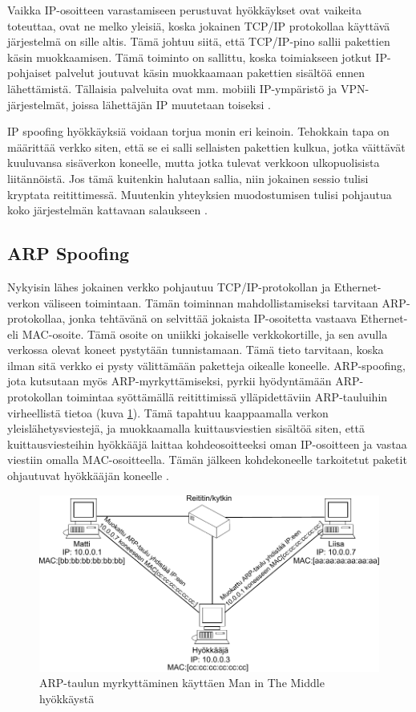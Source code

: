 Vaikka IP-osoitteen varastamiseen perustuvat hyökkäykset ovat vaikeita toteuttaa,
ovat ne melko yleisiä, koska jokainen TCP/IP protokollaa käyttävä järjestelmä on sille altis. Tämä
johtuu siitä, että TCP/IP-pino sallii pakettien käsin muokkaamisen. Tämä
toiminto on sallittu, koska toimiakseen jotkut IP-pohjaiset palvelut joutuvat
käsin muokkaamaan pakettien sisältöä ennen lähettämistä. Tällaisia palveluita
ovat mm. mobiili IP-ympäristö ja VPN-järjestelmät, joissa lähettäjän IP
muutetaan toiseksi \cite{DDOS}.

IP spoofing hyökkäyksiä voidaan torjua monin eri keinoin. Tehokkain tapa on
määrittää verkko siten, että se ei salli sellaisten pakettien kulkua, jotka
väittävät kuuluvansa sisäverkon koneelle, mutta jotka tulevat verkkoon
ulkopuolisista liitännöistä. Jos tämä kuitenkin halutaan sallia, niin jokainen
sessio tulisi kryptata reitittimessä. Muutenkin yhteyksien muodostumisen tulisi
pohjautua koko järjestelmän kattavaan salaukseen \cite{WEBS}.

\subsection{ARP Spoofing}

Nykyisin lähes jokainen verkko pohjautuu TCP/IP-protokollan ja Ethernet-verkon
väliseen toimintaan. Tämän toiminnan mahdollistamiseksi tarvitaan ARP-pro\-to\-kol\-laa,
jonka tehtävänä on selvittää jokaista IP-osoitetta vastaava Ethernet- eli MAC-osoite. Tämä osoite
on uniikki jokaiselle verkkokortille, ja sen avulla verkossa olevat koneet pystytään tunnistamaan.
Tämä tieto tarvitaan, koska ilman sitä verkko ei pysty välittämään paketteja oikealle koneelle.
ARP-spoofing, jota kutsutaan myös ARP-myrkyttämiseksi, pyrkii hyödyntämään ARP-protokollan
toimintaa syöttämällä reitittimissä ylläpidettäviin ARP-tauluihin virheellistä
tietoa (kuva \ref{ARP-spoofing}). Tämä tapahtuu kaappaamalla verkon yleislähetysviestejä, ja muokkaamalla
kuittausviestien sisältöä siten, että kuittausviesteihin hyökkääjä laittaa
kohdeosoitteeksi oman IP-osoitteen ja vastaa viestiin omalla MAC-osoitteella.
Tämän jälkeen kohdekoneelle tarkoitetut paketit ohjautuvat hyökkääjän koneelle \cite{WEBS}.

\begin{figure}[ht]
\centering
\includegraphics[width=12cm]{pics/arp.pdf}
\caption{ARP-taulun myrkyttäminen käyttäen Man in The Middle hyökkäystä}
\label{ARP-spoofing}
\end{figure}

